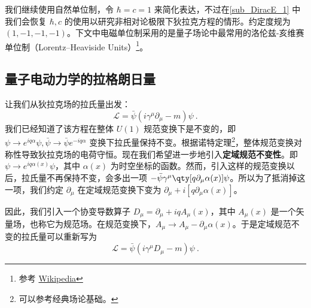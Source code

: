 

我们继续使用自然单位制，令 $\hbar=c=1$ 来简化表达，不过在\autoref{sub_DiracE_1} 中我们会恢复 $\hbar,c$ 的使用以研究非相对论极限下狄拉克方程的情形。约定度规为 $(1,-1,-1,-1)$。下文中电磁单位制采用的是量子场论中最常用的洛伦兹-亥维赛单位制（Lorentz–Heaviside Units）\footnote{参考 \href{https://en.wikipedia.org/wiki/Lorentz–Heaviside_units}{Wikipedia}}。

\subsection{量子电动力学的拉格朗日量}
让我们从狄拉克场的拉氏量出发：
\begin{equation}
\mathcal{L}=\bar\psi (i\gamma^\mu \partial_\mu - m)\psi ~.
\end{equation}
我们已经知道了该方程在整体 $U(1)$ 规范变换下是不变的，即 $\psi\rightarrow e^{iq\alpha}\psi,\bar\psi \rightarrow \bar\psi e^{-iq\alpha}$ 变换下拉氏量保持不变。根据诺特定理\footnote{可以参考经典场论基础。}，整体规范变换对称性导致狄拉克场的电荷守恒。现在我们希望进一步地引入\textbf{定域规范不变性}。即 $\psi\rightarrow e^{iq\alpha(x)}\psi $，其中 $\alpha(x)$ 为时空坐标的函数。然而，引入这样的规范变换以后，拉氏量不再保持不变，会多出一项 $-\bar\psi \gamma^\mu \qty[q\partial_\mu \alpha(x)]\psi$。所以为了抵消掉这一项，我们约定 $\partial_\mu$ 在定域规范变换下变为 $\partial_\mu+i[q\partial_\mu \alpha(x)]$。

因此，我们引入一个协变导数算子 $D_\mu = \partial_\mu +iqA_\mu(x)$，其中 $A_\mu(x)$ 是一个矢量场，也称它为规范场。在规范变换下，$A_\mu\rightarrow A_\mu - \partial_\mu \alpha(x)$。于是定域规范不变的拉氏量可以重新写为
\begin{equation}
\mathcal{L}=\bar\psi(i\gamma^\mu D_\mu-m)\psi ~.
\end{equation}

